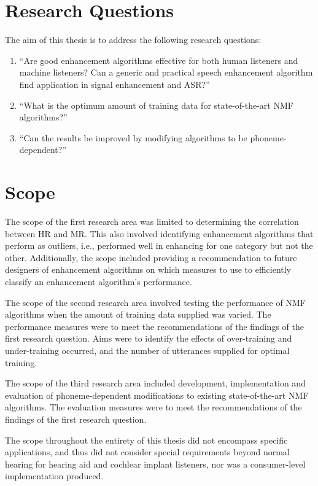 \clearpage{}


\section{Research Questions}

\newcommand{\RQone}{``Are good enhancement algorithms effective for both human listeners and machine listeners? Can a generic and practical speech enhancement algorithm find application in signal enhancement and \ac{ASR}?''}
\newcommand{\RQtwo}{``What is the optimum amount of training data for state-of-the-art \ac{NMF} algorithms?''}
\newcommand{\RQthree}{``Can the results be improved by modifying algorithms to be phoneme-dependent?''}

The aim of this thesis is to address the following research questions:
\begin{enumerate}
\item \label{enu:ResQ1} \RQone{}
\item \label{enu:ResQ2}\RQtwo{}
\item \label{enu:ResQ3}\RQthree{}
\end{enumerate}

\section{Scope}

The scope of the first research area was limited to determining the
correlation between \ac{HR} and \ac{MR}. This also involved identifying
enhancement algorithms that perform as outliers, i.e., performed well
in enhancing for one category but not the other. Additionally, the
scope included providing a recommendation to future designers of enhancement
algorithms on which measures to use to efficiently classify an enhancement
algorithm's performance.

The scope of the second research area involved testing the performance
of \ac{NMF} algorithms when the amount of training data supplied
was varied. The performance measures were to meet the recommendations
of the findings of the first research question. Aims were to identify
the effects of over-training and under-training occurred, and the
number of utterances supplied for optimal training.

The scope of the third research area included development, implementation
and evaluation of phoneme-dependent modifications to existing state-of-the-art
\ac{NMF} algorithms. The evaluation measures were to meet the recommendations
of the findings of the first research question.

The scope throughout the entirety of this thesis did not encompass
specific applications, and thus did not consider special requirements
beyond normal hearing for hearing aid and cochlear implant listeners,
nor was a consumer-level implementation produced.
